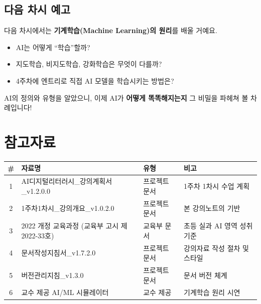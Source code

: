 \documentclass[11pt,a4paper]{article}
\begin{document}
\subsection{ 다음 차시 예고}

다음 차시에서는 \textbf{기계학습(Machine Learning)의 원리}를 배울 거예요.

\begin{itemize}[leftmargin=2em]
\item AI는 어떻게 ``학습''할까?
\item 지도학습, 비지도학습, 강화학습은 무엇이 다를까?
\item 4주차에 엔트리로 직접 AI 모델을 학습시키는 방법은?
\end{itemize}

AI의 정의와 유형을 알았으니, 이제 AI가 \textbf{어떻게 똑똑해지는지} 그 비밀을 파헤쳐 볼 차례입니다!

\newpage
\section*{참고자료}

\begin{center}
\begin{tabular}{|c|p{5.5cm}|p{2.5cm}|p{3.5cm}|}
\hline
\rowcolor{tableheader}
\textbf{\#} & \textbf{자료명} & \textbf{유형} & \textbf{비고} \\
\hline
1 & AI디지털리터러시\_강의계획서\_v1.2.0.0 & 프로젝트 문서 & 1주차 1차시 수업 계획 \\
\hline
2 & 1주차1차시\_강의개요\_v1.0.2.0 & 프로젝트 문서 & 본 강의노트의 기반 \\
\hline
3 & 2022 개정 교육과정 (교육부 고시 제2022-33호) & 교육부 문서 & 초등 실과 AI 영역 성취기준 \\
\hline
4 & 문서작성지침서\_v1.7.2.0 & 프로젝트 문서 & 강의자료 작성 절차 및 스타일 \\
\hline
5 & 버전관리지침\_v1.3.0 & 프로젝트 문서 & 문서 버전 체계 \\
\hline
6 & 교수 제공 AI/ML 시뮬레이터 & 교수 제공 & 기계학습 원리 시연 \\
\hline
\end{tabular}
\end{center}

\end{document}
